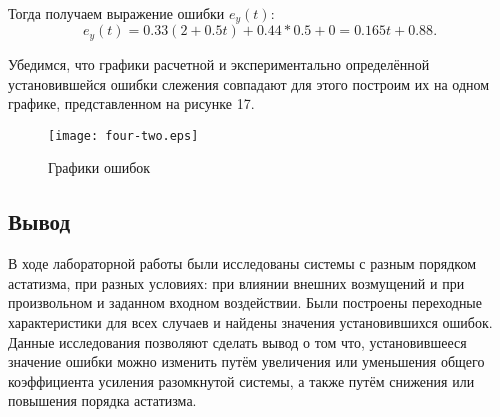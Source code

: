 \documentclass[a4paper,12pt]{article} %
\begin{document}
\par
Тогда получаем выражение ошибки $e_y(t)$:
\begin{equation}
e_y(t) = {0.33(2 + 0.5t) + 0.44 * 0.5 + 0} = 0.165t + 0.88.
\end{equation}
\par
Убедимся, что графики расчетной и экспериментально определённой установившейся ошибки слежения совпадают для этого построим их на одном графике, представленном на рисунке 17.
\begin{figure}[H]
    \centering
    \texttt{[image: four-two.eps]}
    \caption{Графики ошибок}
\end{figure}

\newpage
\begin{center}
\section{Вывод}
\end{center}
\par
В ходе лабораторной работы были исследованы системы с разным порядком астатизма, при разных условиях: при влиянии внешних возмущений и при произвольном и заданном входном воздействии. Были построены переходные характеристики для всех случаев и найдены значения установившихся ошибок. Данные исследования позволяют сделать вывод о том что, установившееся значение ошибки можно изменить путём увеличения или уменьшения общего коэффициента усиления разомкнутой системы, а также путём снижения или повышения порядка астатизма. 
\end{document}
